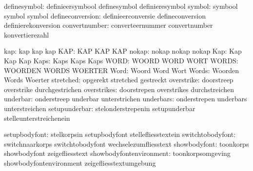                  definesymbol:  definieersymbool             definesymbol
                                definieresymbol
                       symbol:  symbool                      symbol
                                symbol
             defineconversion:  definieerconversie           defineconversion
                                definierekonversion
                convertnumber:  converteernummer             convertnumber
                                konvertierezahl

                          kap:  kap                          kap
                                kap
                          KAP:  KAP                          KAP
                                KAP
                        nokap:  nokap                        nokap
                                nokap
                          Kap:  Kap                          Kap
                                Kap
                         Kaps:  Kaps                         Kaps
                                Kaps
                         WORD:  WOORD                        WORD
                                WORT
                        WORDS:  WOORDEN                      WORDS
                                WOERTER
                         Word:  Woord                        Word
                                Wort
                        Words:  Woorden                      Words
                                Woerter
                    stretched:  opgerekt                     stretched
                                gestreckt
                   overstrike:  doorstreep                   overstrike
                                durchgestrichen
                  overstrikes:  doorstrepen                  overstrikes
                                durchstreichen
                     underbar:  onderstreep                  underbar
                                unterstrichen
                    underbars:  onderstrepen                 underbars
                                unterstreichen
                setupunderbar:  stelonderstrepenin           setupunderbar
                                stelleunterstreichenein

                setupbodyfont:  stelkorpsin                  setupbodyfont
                                stellefliesstextein
             switchtobodyfont:  switchnaarkorps              switchtobodyfont
                                wechselezumfliesstext
                 showbodyfont:  toonkorps                    showbodyfont
                                zeigefliesstext
      showbodyfontenvironment:  toonkorpsomgeving            showbodyfontenvironment
                                zeigefliesstextumgebung

